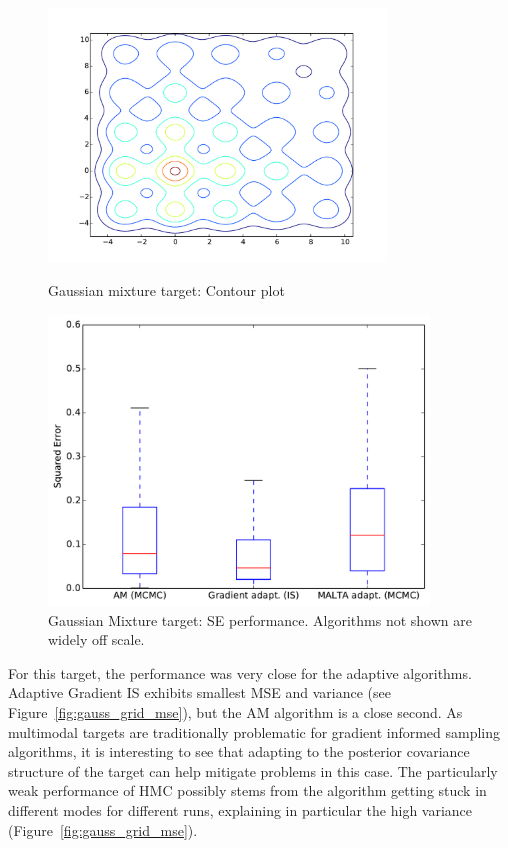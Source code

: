 \begin{figure}[tbp]
\begin{center}
\begin{minipage}[t]{0.5\textwidth}
\centering
\includegraphics[width=0.8\textwidth]{figures/Gauss_Grid_Contour.pdf} 
\caption{Gaussian mixture target: Contour plot}
\label{fig:gauss_grid_contour}
\end{minipage}\hfill
\begin{minipage}[t]{0.5\textwidth}
\centering
\includegraphics[width=0.9\textwidth]{figures/Gauss_Grid_boxplot.pdf} 
\caption{Gaussian Mixture target: SE performance. Algorithms not shown are widely off scale.} 

\label{fig:gauss_grid_box}
\end{minipage}

\end{center}
\end{figure}

For this target, the performance was very close for the adaptive algorithms. Adaptive Gradient IS exhibits smallest MSE and variance (see Figure~\ref{fig:gauss_grid_mse}), but the AM algorithm is a close second. As multimodal targets are traditionally problematic for gradient informed sampling algorithms, it is interesting to see that adapting to the posterior covariance structure of the target can help mitigate problems in this case. The particularly weak performance of HMC possibly stems from the algorithm getting stuck in different modes for different runs, explaining in particular the high variance (Figure~\ref{fig:gauss_grid_mse}). 



